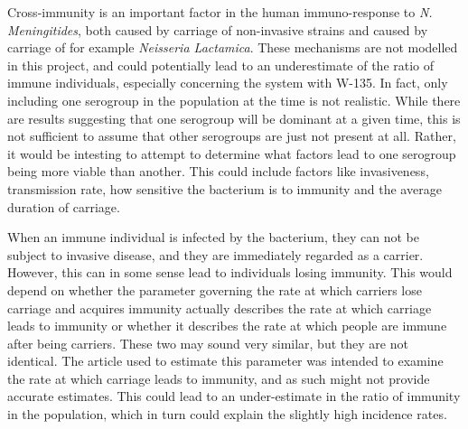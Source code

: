 \documentclass[10pt,a4paper]{article}
\begin{document}
Cross-immunity is an important factor in the human immuno-response to \emph{N. Meningitides}, both caused by carriage of non-invasive strains and caused by carriage of for example \emph{Neisseria Lactamica}. These mechanisms are not modelled in this project, and could potentially lead to an underestimate of the ratio of immune individuals, especially concerning the system with W-135. In fact, only including one serogroup in the population at the time is not realistic. While there are results suggesting that one serogroup will be dominant at a given time, this is not sufficient to assume that other serogroups are just not present at all. Rather, it would be intesting to attempt to determine what factors lead to one serogroup being more viable than another. This could include factors like invasiveness, transmission rate, how sensitive the bacterium is to immunity and the average duration of carriage.

When an immune individual is infected by the bacterium, they can not be subject to invasive disease, and they are immediately regarded as a carrier. However, this can in some sense lead to individuals losing immunity. This would depend on whether the parameter governing the rate at which carriers lose carriage and acquires immunity actually describes the rate at which carriage leads to immunity or whether it describes the rate at which people are immune after being carriers. These two may sound very similar, but they are not identical. The article used to estimate this parameter was intended to examine the rate at which carriage leads to immunity, and as such might not provide accurate estimates. This could lead to an under-estimate in the ratio of immunity in the population, which in turn could explain the slightly high incidence rates.


%
%
\end{document}

